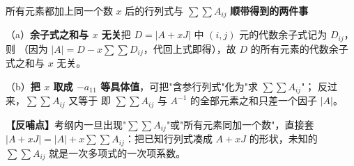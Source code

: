\begin{fdeep}{所有元素都加上同一个数 $x$ 后的行列式与 $\sum\sum A_{ij}$}
\textbf{顺带得到的两件事}

（a）\textbf{余子式之和与 $x$ 无关}\quad 把 $D=|A+xJ|$ 中 $(i,j)$ 元的代数余子式记为 $D_{ij}$，则
（因为 $|A|=D-x\sum\sum D_{ij}$，代回上式即得），故 $D$ 的所有元素的代数余子式之和与 $x$ 无关。

（b）\textbf{把 $x$ 取成 $-a_{11}$ 等具体值}，可把"含参行列式"化为"求 $\sum\sum A_{ij}$"；
反过来，$\sum\sum A_{ij}$ 又等于
即 $\sum\sum A_{ij}$ 与 $A^{-1}$ 的全部元素之和只差一个因子 $|A|$。

\textbf{【反哺点】}考纲内一旦出现"$\sum\sum A_{ij}$"或"所有元素同加一个数"，直接套 $|A+xJ|=|A|+x\sum\sum A_{ij}$：把已知行列式凑成 $A+xJ$ 的形状，未知的 $\sum\sum A_{ij}$ 就是一次多项式的一次项系数。
\end{fdeep}


